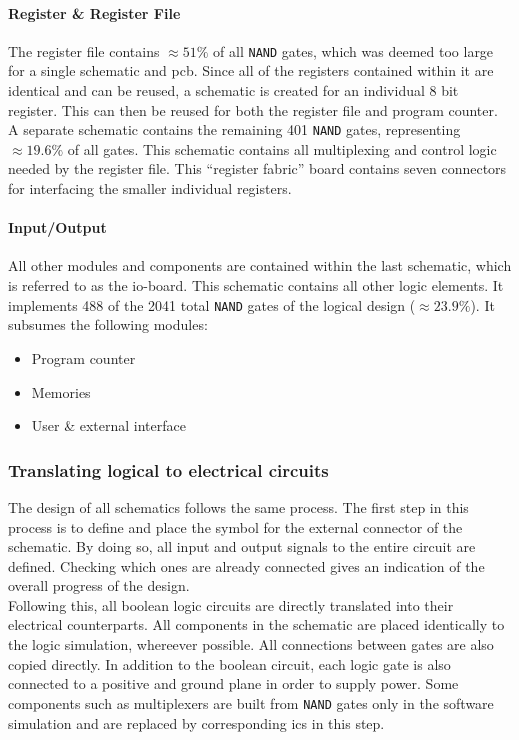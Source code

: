 \paragraph*{Register \& Register File}

The register file contains $\approx 51\%$ of all \texttt{NAND} gates, which was deemed too large for a single schematic and \ac{pcb}. Since all of the registers contained within it are identical and can be reused, a schematic is created for an individual 8 bit register. This can then be reused for both the register file and program counter. A separate schematic contains the remaining 401 \texttt{NAND} gates, representing $\approx 19.6\%$ of all gates. This schematic contains all multiplexing and control logic needed by the register file. This ``register fabric'' board contains seven connectors for interfacing the smaller individual registers.

\paragraph*{Input/Output}

All other modules and components are contained within the last schematic, which is referred to as the \ac{io}-board. This schematic contains all other logic elements. It implements 488 of the 2041 total \texttt{NAND} gates of the logical design ($\approx 23.9\%$). It subsumes the following modules:

\begin{itemize}
    \item Program counter
    \item Memories
    \item User \& external interface
\end{itemize}

\subsubsection{Translating logical to electrical circuits}

The design of all schematics follows the same process. The first step in this process is to define and place the symbol for the external connector of the schematic. By doing so, all input and output signals to the entire circuit are defined. Checking which ones are already connected gives an indication of the overall progress of the design.
\\

Following this, all boolean logic circuits are directly translated into their electrical counterparts. All components in the schematic are placed identically to the logic simulation, whereever possible. All connections between gates are also copied directly. In addition to the boolean circuit, each logic gate is also connected to a positive and ground plane in order to supply power. Some components such as multiplexers are built from \texttt{NAND} gates only in the software simulation and are replaced by corresponding \acp{ic} in this step.
\\

